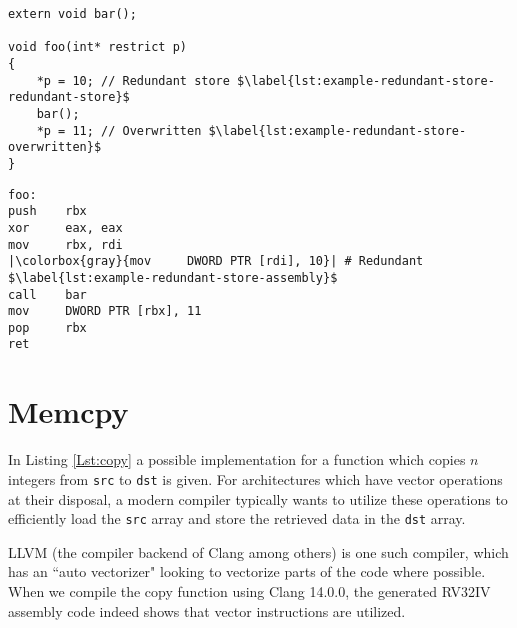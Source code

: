 \begin{figure*}[!h]
\centering
\begin{minipage}[t]{0.5\linewidth}
\centering
\begin{code}
\begin{verbatim}
extern void bar();

void foo(int* restrict p)
{
    *p = 10; // Redundant store $\label{lst:example-redundant-store-redundant-store}$
    bar();
    *p = 11; // Overwritten $\label{lst:example-redundant-store-overwritten}$
}
\end{verbatim}
\end{code}
\end{minipage}%
\begin{minipage}[t]{0.5\linewidth}
\centering
\begin{code}
\centering
\begin{verbatim}
foo:
push    rbx
xor     eax, eax
mov     rbx, rdi
|\colorbox{gray}{mov     DWORD PTR [rdi], 10}| # Redundant $\label{lst:example-redundant-store-assembly}$
call    bar
mov     DWORD PTR [rbx], 11
pop     rbx
ret
\end{verbatim}
\end{code}
\end{minipage}
\label{lst:example-redundant-store}
\end{figure*}

\section{Memcpy}\label{section-example-memcpy}



In Listing \ref{Lst:copy} a possible implementation for a function which
copies $n$ integers from \texttt{src} to \texttt{dst} is given.
For architectures which have vector operations at their disposal, a modern compiler typically wants to utilize these operations
to efficiently load the \texttt{src} array and store the retrieved data in the \texttt{dst} array.

LLVM (the compiler backend of Clang among others) is one such compiler, which has an ``auto vectorizer" looking to vectorize parts of the code where possible.
When we compile the copy function using Clang 14.0.0, the generated RV32IV assembly code indeed shows that vector instructions are utilized.

